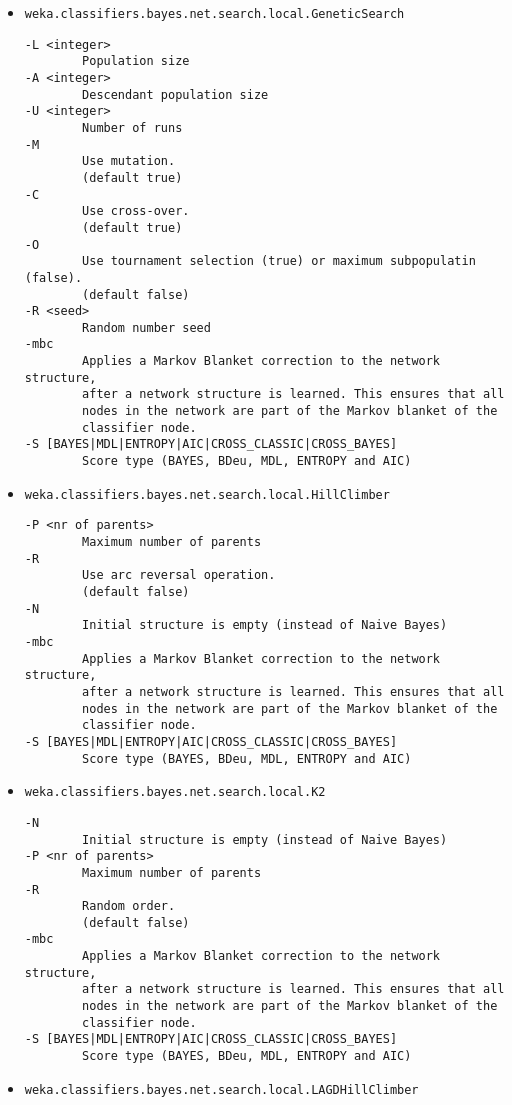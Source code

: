 \documentclass[a4paper]{article}
\begin{document}
\begin{itemize}
\item \texttt{weka.classifiers.bayes.net.search.local.GeneticSearch}
  \begin{verbatim}
-L <integer>
        Population size
-A <integer>
        Descendant population size
-U <integer>
        Number of runs
-M
        Use mutation.
        (default true)
-C
        Use cross-over.
        (default true)
-O
        Use tournament selection (true) or maximum subpopulatin (false).
        (default false)
-R <seed>
        Random number seed
-mbc
        Applies a Markov Blanket correction to the network structure,
        after a network structure is learned. This ensures that all
        nodes in the network are part of the Markov blanket of the
        classifier node.
-S [BAYES|MDL|ENTROPY|AIC|CROSS_CLASSIC|CROSS_BAYES]
        Score type (BAYES, BDeu, MDL, ENTROPY and AIC)
  \end{verbatim}
\item \texttt{weka.classifiers.bayes.net.search.local.HillClimber}
  \begin{verbatim}
-P <nr of parents>
        Maximum number of parents
-R
        Use arc reversal operation.
        (default false)
-N
        Initial structure is empty (instead of Naive Bayes)
-mbc
        Applies a Markov Blanket correction to the network structure,
        after a network structure is learned. This ensures that all
        nodes in the network are part of the Markov blanket of the
        classifier node.
-S [BAYES|MDL|ENTROPY|AIC|CROSS_CLASSIC|CROSS_BAYES]
        Score type (BAYES, BDeu, MDL, ENTROPY and AIC)
  \end{verbatim}
\item \texttt{weka.classifiers.bayes.net.search.local.K2}
  \begin{verbatim}
-N
        Initial structure is empty (instead of Naive Bayes)
-P <nr of parents>
        Maximum number of parents
-R
        Random order.
        (default false)
-mbc
        Applies a Markov Blanket correction to the network structure,
        after a network structure is learned. This ensures that all
        nodes in the network are part of the Markov blanket of the
        classifier node.
-S [BAYES|MDL|ENTROPY|AIC|CROSS_CLASSIC|CROSS_BAYES]
        Score type (BAYES, BDeu, MDL, ENTROPY and AIC)
  \end{verbatim}
\item \texttt{weka.classifiers.bayes.net.search.local.LAGDHillClimber}
  \begin{verbatim}

\end{verbatim}
\end{itemize}
\end{document}
